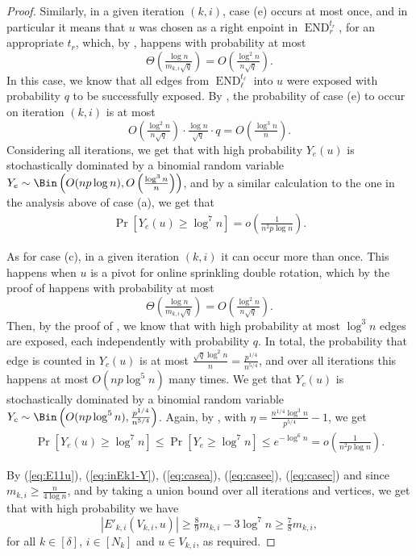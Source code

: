 \documentclass{article}
\DeclareMathOperator{\END}{END}
\begin{document}
\begin{proof}
		Similarly, in a given iteration $(k,i)$, case (e) occurs at most once, and in particular it means that $u$ was chosen as a right enpoint in $\END^{t_r}_r$, for an appropriate $t_r$, which, by , happens with probability at most
		\[\Theta\left(\tfrac{\log n}{m_{k,i}\sqrt{q}} \right) = O\left(\tfrac{\log^2 n}{n\sqrt{q}} \right).\]
		In this case, we know that all edges from $\END_{\ell}^{t_{\ell}}$ into $u$ were exposed with probability $q$ to be successfully exposed.
		By , the probability of case (e) to occur on iteration $(k,i)$ is at most
		\[O\left(\tfrac{\log^2 n}{n\sqrt{q}} \right) \cdot \tfrac{\log n}{\sqrt{q}} \cdot q = O\left(\tfrac{\log^3 n}{n} \right). \]
		Considering all iterations, we get that with high probability $Y_e(u)$ is stochastically dominated by a binomial random variable $Y_e \sim \Bin\left(O(np\log n), O\left(\frac{\log^3 n}{n} \right) \right)$, and by a similar calculation to the one in the analysis above of case (a), we get that
		\begin{align}
		\label{eq:casee}
		\Pr\left[Y_e(u) \ge \log^7 n \right] = o\left(\tfrac{1}{n^2p\log n} \right).
		\end{align}
		
		As for case (c), in a given iteration $(k,i)$ it can occur more than once.
		This happens when $u$ is a pivot for online sprinkling double rotation, which by the proof of  happens with probability at most
		\[\Theta\left(\tfrac{\log n}{m_{k,i}\sqrt{q}} \right) = O\left(\tfrac{\log^2 n}{n\sqrt{q}} \right). \]
		Then, by the proof of , we know that with high probability at most $\log^3 n$ edges are exposed, each independently with probability $q$.
		In total, the probability that edge is counted in $Y_c(u)$ is at most $\frac{\sqrt{q} \log^2 n}{n} = \frac{p^{1/4}}{n^{5/4}}$, and over all iterations this happens at most $O(np\log^5 n)$ many times.
		We get that $Y_c(u)$ is stochastically dominated by a binomial random variable $Y_c\sim \Bin\left(O(np\log^5 n), \frac{p^{1/4}}{n^{5/4}} \right)$.
		Again, by , with $\eta = \frac{n^{1/4}\log^3 n}{p^{5/4}} - 1$, we get
		\begin{align}
		\label{eq:casec}
		\Pr\left[Y_e(u) \ge \log^7 n \right] \le \Pr\left[Y_e \ge \log^7 n \right] \le e^{-\log^6 n} = o\left(\tfrac{1}{n^2p\log n} \right).
		\end{align}
		
		By (\ref{eq:E11u}), (\ref{eq:inEk1-Y}), (\ref{eq:casea}), (\ref{eq:casee}), (\ref{eq:casec}) and since $m_{k,i} \ge \frac{n}{4\log n}$, and by taking a union bound over all iterations and vertices, we get that with high probability we have
		\[\left|E'_{k,i}\left(V_{k,i}, u \right) \right| \ge \tfrac{8}{9}m_{k,i} - 3\log^7 n \ge \tfrac{7}{8}m_{k,i}, \]
		for all $k \in [\delta]$, $i \in [N_k]$ and $u \in V_{k,i}$, as required.
		

\end{proof}
\end{document}

